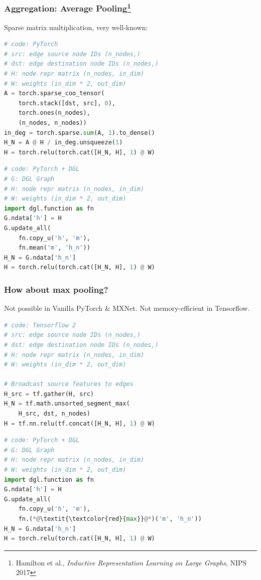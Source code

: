 \documentclass[10pt,aspectratio=169]{beamer}
\begin{document}
	\begin{frame}[fragile]
		\frametitle{Aggregation: Average Pooling\footnote{Hamilton et al., \emph{Inductive Representation Learning on Large Graphs}, NIPS 2017}}
		\begin{minipage}{0.5\textwidth}
			Sparse matrix multiplication, very well-known:
\begin{lstlisting}[language=Python]
# code: PyTorch
# src: edge source node IDs (n_nodes,)
# dst: edge destination node IDs (n_nodes,)
# H: node repr matrix (n_nodes, in_dim)
# W: weights (in_dim * 2, out_dim)
A = torch.sparse_coo_tensor(
    torch.stack([dst, src], 0),
    torch.ones(n_nodes),
    (n_nodes, n_nodes))
in_deg = torch.sparse.sum(A, 1).to_dense()
H_N = A @ H / in_deg.unsqueeze(1)
H = torch.relu(torch.cat([H_N, H], 1) @ W)
\end{lstlisting}
		\end{minipage}%
		\begin{minipage}{0.5\textwidth}
\begin{lstlisting}[language=Python]
# code: PyTorch + DGL
# G: DGL Graph
# H: node repr matrix (n_nodes, in_dim)
# W: weights (in_dim * 2, out_dim)
import dgl.function as fn
G.ndata['h'] = H
G.update_all(
    fn.copy_u('h', 'm'),
    fn.mean('m', 'h_n'))
H_N = G.ndata['h_n']
H = torch.relu(torch.cat([H_N, H], 1) @ W)
\end{lstlisting}
		\end{minipage}
	\end{frame}

	\begin{frame}[fragile]
		\frametitle{How about max pooling?}
		
			Not possible in Vanilla PyTorch \& MXNet.  Not memory-efficient in Tensorflow.
\begin{minipage}{0.5\textwidth}
\begin{lstlisting}[language=Python]
# code: Tensorflow 2
# src: edge source node IDs (n_nodes,)
# dst: edge destination node IDs (n_nodes,)
# H: node repr matrix (n_nodes, in_dim)
# W: weights (in_dim * 2, out_dim)

# Broadcast source features to edges
H_src = tf.gather(H, src)
H_N = tf.math.unsorted_segment_max(
    H_src, dst, n_nodes)
H = tf.nn.relu(tf.concat([H_N, H], 1) @ W)
\end{lstlisting}
\end{minipage}%
\begin{minipage}{0.5\textwidth}
\begin{lstlisting}[language=Python]
# code: PyTorch + DGL
# G: DGL Graph
# H: node repr matrix (n_nodes, in_dim)
# W: weights (in_dim * 2, out_dim)
import dgl.function as fn
G.ndata['h'] = H
G.update_all(
    fn.copy_u('h', 'm'),
    fn.(*@\textit{\textcolor{red}{max}}@*)('m', 'h_n'))
H_N = G.ndata['h_n']
H = torch.relu(torch.cat([H_N, H], 1) @ W)
\end{lstlisting}
\end{minipage}
	\end{frame}
\end{document}
